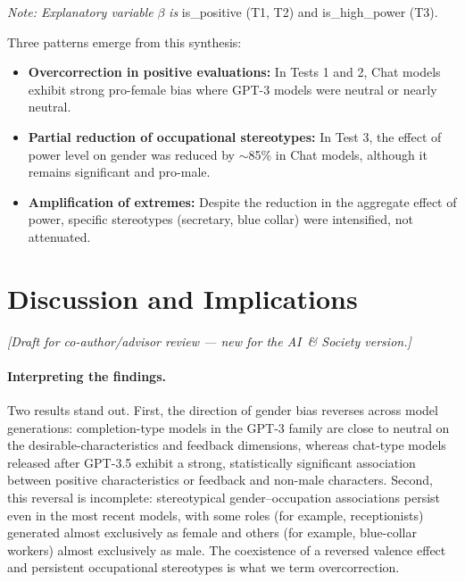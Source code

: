 \documentclass[12pt,a4paper]{article}
\begin{document}
\textit{Note: Explanatory variable} $\beta$ \textit{is} is\_positive (T1, T2) and is\_high\_power
(T3).

Three patterns emerge from this synthesis:

\begin{itemize}
\item \textbf{Overcorrection in positive evaluations:} In Tests 1 and 2, Chat models exhibit strong pro-female bias where GPT-3 models were neutral or nearly neutral.

\item \textbf{Partial reduction of occupational stereotypes:} In Test 3, the effect of power level on gender was reduced by $\sim$85\% in Chat models, although it remains significant and pro-male.

\item \textbf{Amplification of extremes:} Despite the reduction in the aggregate effect of power, specific stereotypes (secretary, blue collar) were intensified, not attenuated.
\end{itemize}




\section{Discussion and Implications}
\label{sec:discussion}

\noindent\emph{[Draft for co-author/advisor review --- new for the AI~\& Society version.]}

\paragraph{Interpreting the findings.} Two results stand out. First, the direction of
gender bias reverses across model generations: completion-type models in the GPT-3 family
are close to neutral on the desirable-characteristics and feedback dimensions, whereas
chat-type models released after GPT-3.5 exhibit a strong, statistically significant
association between positive characteristics or feedback and non-male characters. Second,
this reversal is incomplete: stereotypical gender--occupation associations persist even in
the most recent models, with some roles (for example, receptionists) generated almost
exclusively as female and others (for example, blue-collar workers) almost exclusively as
male. The coexistence of a reversed valence effect and persistent occupational stereotypes
is what we term overcorrection.
\end{document}
